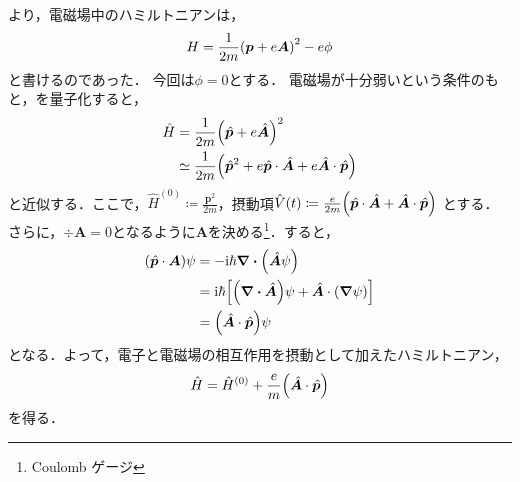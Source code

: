 \documentclass{report}
\begin{document}
  より，電磁場中のハミルトニアンは，
  \begin{align}
    H = \frac{1}{2m}\qty(\bm{p} + e\bm{A})^2 - e\phi\label{hamiltonian-in-electro-magnetic-field-cm-re}
  \end{align}
  と書けるのであった．
  今回は$\phi = 0$とする．
  電磁場が十分弱いという条件のもと，を量子化すると，
  \begin{align}
    \hat{H} &= \frac{1}{2m}\qty(\hat{\bm{p}} + e\hat{\bm{A}})^2 \\
    &\simeq \frac{1}{2m}\qty(\hat{\bm{p}}^2 + e\hat{\bm{p}}\cdot\hat{\bm{A}} + e\hat{\bm{A}} \cdot \hat{\bm{p}})\\
  \end{align}
  と近似する．ここで，$\hat{H}^{(0)} \coloneqq \frac{\bm{p}^2}{2m}$，摂動項$\hat{V}(t) \coloneqq \frac{e}{2m} \qty(\hat{\bm{p}}\cdot\hat{\bm{A}} + \hat{\bm{A}} \cdot \hat{\bm{p}})$
  とする．さらに，$\div\bm{A} = 0$となるように$\bm{A}$を決める\footnote{Coulomb ゲージ}．すると，
  \begin{align}
    \qty(\hat{\bm{p}} \cdot \bm{A})\psi &= -\mathrm{i}\hbar \div\qty(\hat{\bm{A}} \psi)\\
    &= \mathrm{i}\hbar\qty[\qty(\div\hat{\bm{A}}) \psi + \hat{\bm{A}} \cdot \qty(\grad \psi)]\\
    &= \qty(\hat{\bm{A}} \cdot \hat{\bm{p}}) \psi
  \end{align}
  となる．よって，電子と電磁場の相互作用を摂動として加えたハミルトニアン，
  \begin{align}
    \hat{H} = \hat{H}^{(0)} + \frac{e}{m}\qty(\hat{\bm{A}} \cdot \hat{\bm{p}})
  \end{align}
  を得る．
\end{document}
